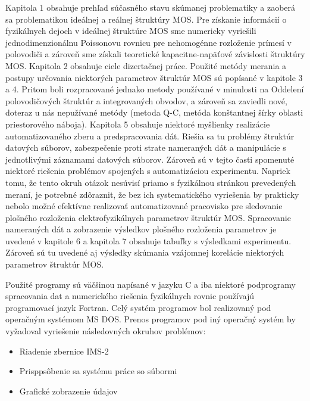 \par Kapitola 1 obsahuje prehľad súčasného stavu skúmanej problematiky
a zaoberá sa problematikou ideálnej a reálnej štruktúry MOS\@. Pre
získanie informácií o fyzikálnych dejoch v ideálnej štruktúre MOS sme
numericky vyriešili jednodimenzionálnu Poissonovu rovnicu pre
nehomogénne rozloženie prímesí v polovodiči a zároveň sme získali
teoretické kapacitne-napäťové závislosti štruktúry MOS\@. Kapitola 2
obsahuje ciele dizertačnej práce. Použité metódy merania a postupy
určovania niektorých parametrov štruktúr MOS sú popísané v kapitole 3
a 4. Pritom boli rozpracované jednako metody používané v minulosti na
Oddelení polovodičových štruktúr a integrovaných obvodov, a zároveň sa
zaviedli nové, doteraz u nás nepužívané metódy (metoda Q-C, metóda
konštantnej šírky oblasti priestorového náboja). Kapitola 5 obsahuje
niektoré myšlienky realizácie automatizovaného zberu a predspracovania
dát. Riešia sa tu problémy štruktúr datových súborov, zabezpečenie
proti strate nameraných dát a manipulácie s jednotlivými záznamami
datových súborov. Zároveň sú v tejto časti spomenuté niektoré riešenia
problémov spojených s automatizáciou experimentu. Napriek tomu, že
tento okruh otázok nesúvisí priamo s fyzikálnou stránkou prevedených
meraní, je potrebné zdôraznit, že bez ich systematického vyriešenia by
prakticky nebolo možné efektívne realizovať automatizované pracovisko
pre sledovanie plošného rozloženia elektrofyzikálnych parametrov
štruktúr MOS\@. Spracovanie nameraných dát a zobrazenie výsledkov
plošného rozloženia parametrov je uvedené v kapitole 6 a kapitola 7
obsahuje tabuľky s výsledkami experimentu. Zároveň sú tu uvedené aj
výsledky skúmania vzájomnej korelácie niektorých parametrov štruktúr
MOS\@.

\par Použité programy sú väčšinou napísané v jazyku C a iba niektoré
podprogramy spracovania dat a numerického riešenia fyzikálnych rovnic
používajú programovací jazyk Fortran. Celý systém programov bol
realizovaný pod operačným systémom MS DOS\@. Prenos programov pod iný
operačný systém by vyžadoval vyriešenie následovných okruhov
problémov:

\begin{itemize}
\item Riadenie zbernice IMS-2
\item Prisppsôbenie sa systému práce so súbormi
\item Grafické zobrazenie údajov
\end{itemize}

